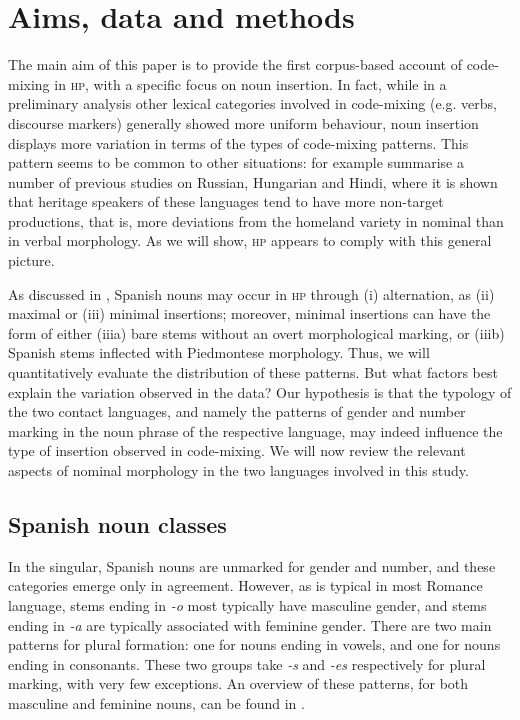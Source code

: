 \documentclass[output=paper]{langscibook}
\begin{document}
\section{Aims, data and methods}\label{sec:goria:4}

The main aim of this paper is to provide the first corpus-based account of code-mixing in \textsc{hp}, with a specific focus on noun insertion. In fact, while in a preliminary analysis \citep{Goria2021} other lexical categories involved in code-mixing (e.g. verbs, discourse markers) generally showed more uniform behaviour, noun insertion displays more variation in terms of the types of code-mixing patterns. This pattern seems to be common to other situations: for example \citet{BenmamounEtAl2013} summarise a number of previous studies on Russian, Hungarian and Hindi, where it is shown that heritage speakers of these languages tend to have more non-target productions, that is, more deviations from the homeland variety in nominal than in verbal morphology. As we will show, \textsc{hp} appears to comply with this general picture.

As discussed in , Spanish nouns may occur in \textsc{hp} through (i) alternation, as (ii) maximal or (iii) minimal insertions; moreover, minimal insertions can have the form of either (iiia) bare stems without an overt morphological marking, or (iiib) Spanish stems inflected with Piedmontese morphology. Thus, we will quantitatively evaluate the distribution of these patterns. But what factors best explain the variation observed in the data? Our hypothesis is that the typology of the two contact languages, and namely the patterns of gender and number marking in the noun phrase of the respective language, may indeed influence the type of insertion observed in code-mixing. We will now review the relevant aspects of nominal morphology in the two languages involved in this study.

\subsection{Spanish noun classes}

In the singular, Spanish nouns are unmarked for gender and number, and these categories emerge only in agreement. However, as is typical in most Romance language, stems ending in \textit{{}-o} most typically have masculine gender, and stems ending in \textit{{}-a} are typically associated with feminine gender. There are two main patterns for plural formation: one for nouns ending in vowels, and one for nouns ending in consonants. These two groups take \textit{{}-s} and \textit{{}-es} respectively for plural marking, with very few exceptions. An overview of these patterns, for both masculine and feminine nouns, can be found in .
\end{document}
